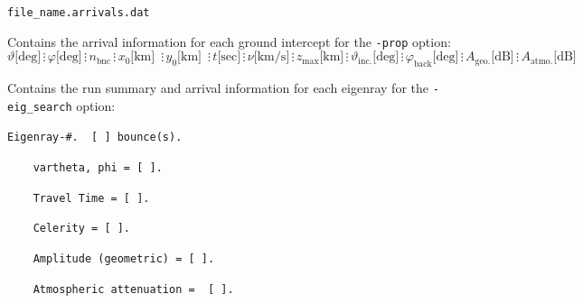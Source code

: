 \documentclass[10pt]{article}
\begin{document}
	\verb=file_name.arrivals.dat=
	
	Contains the arrival information for each ground intercept for the \verb=-prop= option:
	\begin{equation*}
	\vartheta \text{[deg]} \hspace{2pt} \vdots \hspace{2pt} 
	\varphi \text{[deg]} \hspace{2pt} \vdots \hspace{2pt} 
	n_\text{bnc} \hspace{2pt} \vdots \hspace{2pt}
	x_0 \text{[km] } \hspace{2pt} \vdots \hspace{2pt}  
	y_0 \text{[km] } \hspace{2pt} \vdots \hspace{2pt}  
	t \text{[sec]} \hspace{2pt} \vdots \hspace{2pt} 
	\nu \text{[km/s]} \hspace{2pt} \vdots \hspace{2pt} 
	z_\text{max} \text{[km]} \hspace{2pt} \vdots \hspace{2pt} 
	\vartheta_\text{inc.} \text{[deg]} \hspace{2pt} \vdots \hspace{2pt}
	\varphi_\text{back} \text{[deg]} \hspace{2pt} \vdots \hspace{2pt}
	A_\text{geo.} \text{[dB]} \hspace{2pt} \vdots \hspace{2pt}
	A_\text{atmo.} \text{[dB]}	
	\end{equation*}

	Contains the run summary and arrival information for each eigenray for the \verb=-eig_search= option:

	\verb=Eigenray-#.  [ ] bounce(s).=
	
	\hspace{25pt} \verb#	vartheta, phi = [ ].#
	
	\hspace{25pt} \verb#	Travel Time = [ ]. #

	\hspace{25pt} \verb#	Celerity = [ ]. #

 	\hspace{25pt} \verb#	Amplitude (geometric) = [ ]. #

 	\hspace{24pt} \verb#	Atmospheric attenuation =  [ ]. #
\end{document}

